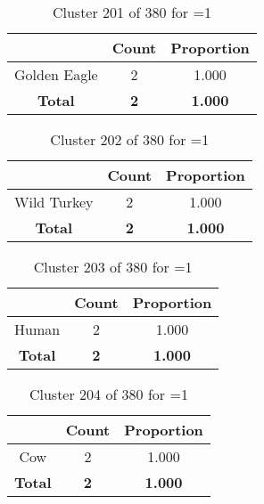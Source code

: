 \begin{table}[ht!]
\centering
\begin{tabular}{|c|c|c|}
\hline
\bf \Spec{} &\bf Count &\bf Proportion\\ \hline \hline
Golden Eagle & 2 & 1.000\\ \hline
\hline
\bf Total & \bf 2 & \bf 1.000\\ \hline
\end{tabular}
\label{tab:cluster:201:1}
\caption{Cluster 201 of 380 for \minneigh{}=1}
\end{table}

\begin{table}[ht!]
\centering
\begin{tabular}{|c|c|c|}
\hline
\bf \Spec{} &\bf Count &\bf Proportion\\ \hline \hline
Wild Turkey & 2 & 1.000\\ \hline
\hline
\bf Total & \bf 2 & \bf 1.000\\ \hline
\end{tabular}
\label{tab:cluster:202:1}
\caption{Cluster 202 of 380 for \minneigh{}=1}
\end{table}

\begin{table}[ht!]
\centering
\begin{tabular}{|c|c|c|}
\hline
\bf \Spec{} &\bf Count &\bf Proportion\\ \hline \hline
Human & 2 & 1.000\\ \hline
\hline
\bf Total & \bf 2 & \bf 1.000\\ \hline
\end{tabular}
\label{tab:cluster:203:1}
\caption{Cluster 203 of 380 for \minneigh{}=1}
\end{table}

\begin{table}[ht!]
\centering
\begin{tabular}{|c|c|c|}
\hline
\bf \Spec{} &\bf Count &\bf Proportion\\ \hline \hline
Cow & 2 & 1.000\\ \hline
\hline
\bf Total & \bf 2 & \bf 1.000\\ \hline
\end{tabular}
\label{tab:cluster:204:1}
\caption{Cluster 204 of 380 for \minneigh{}=1}
\end{table}

